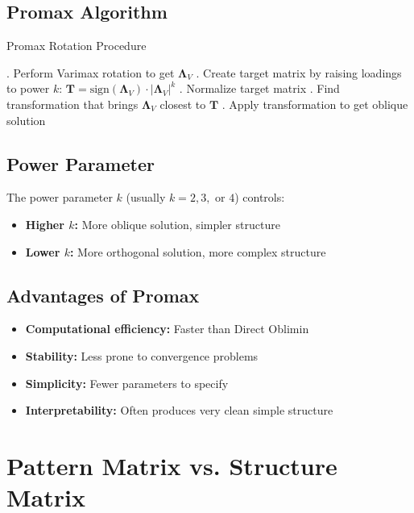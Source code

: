 \documentclass[a4paper]{tufte-book}
\begin{document}
\subsection{Promax Algorithm}

\begin{algorithm}
\caption{Promax Rotation Procedure}
\begin{algorithmic}
. Perform Varimax rotation to get $\boldsymbol{\Lambda}_V$
. Create target matrix by raising loadings to power $k$: $\mathbf{T} = \text{sign}(\boldsymbol{\Lambda}_V) \cdot |\boldsymbol{\Lambda}_V|^k$
. Normalize target matrix
. Find transformation that brings $\boldsymbol{\Lambda}_V$ closest to $\mathbf{T}$
. Apply transformation to get oblique solution
\end{algorithmic}
\end{algorithm}

\subsection{Power Parameter}

The power parameter $k$ (usually $k = 2, 3, \text{ or } 4$) controls:
\begin{itemize}
\item \textbf{Higher $k$:} More oblique solution, simpler structure
\item \textbf{Lower $k$:} More orthogonal solution, more complex structure
\end{itemize}

\subsection{Advantages of Promax}

\begin{itemize}
\item \textbf{Computational efficiency:} Faster than Direct Oblimin
\item \textbf{Stability:} Less prone to convergence problems
\item \textbf{Simplicity:} Fewer parameters to specify
\item \textbf{Interpretability:} Often produces very clean simple structure
\end{itemize}

\section{Pattern Matrix vs. Structure Matrix}
\end{document}
